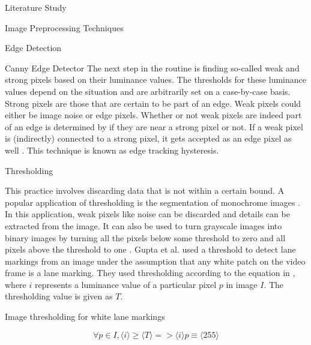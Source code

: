 \documentclass{matthijs}
\begin{document}
\begin{hoofdstuk}{Literature Study}
\begin{paragraaf}{Image Preprocessing Techniques}
\begin{subparagraaf}{Edge Detection}
\begin{subsubparagraaf}{Canny Edge Detector}
					The next step in the routine is finding so-called weak and strong pixels based on their luminance values.
					The thresholds for these luminance values depend on the situation and are arbitrarily set on a case-by-case basis.
					Strong pixels are those that are certain to be part of an edge.
					Weak pixels could either be image noise or edge pixels.
					Whether or not weak pixels are indeed part of an edge is determined by if they are near a strong pixel or not.
					If a weak pixel is (indirectly) connected to a strong pixel, it gets accepted as an edge pixel as well \cite{canny1986computational}.
					This technique is known as edge tracking hysteresis.

				\end{subsubparagraaf}

			\end{subparagraaf}

			\begin{subparagraaf}{Thresholding}

				This practice involves discarding data that is not within a certain bound.
				A popular application of thresholding is the segmentation of monochrome images \cite{humaidi2018fpga}.
				In this application, weak pixels like noise can be discarded and details can be extracted from the image.
				It can also be used to turn grayscale images into binary images by turning all the pixels below some threshold to zero and all pixels above the threshold to one \cite{morse2000thresholding}.
				Gupta et al. \cite{gupta2016automated} used a threshold to detect lane markings from an image under the assumption that any white patch on the video frame is a lane marking.
				They used thresholding according to the equation in , where $i$ represents a luminance value of a particular pixel $p$ in image $I$.
				The thresholding value is given as $T$.

				\begin{figuur}{Image thresholding for white lane markings}

					\begin{equation*}
						\forall p \in I,\langle i \rangle \geq \langle T \rangle => \langle i \rangle p \equiv \langle 255 \rangle
					\end{equation*}\cite{gupta2016automated}

				\end{figuur}

				\bigskip
				

\end{subparagraaf}
\end{paragraaf}
\end{hoofdstuk}
\end{document}

